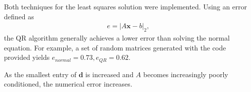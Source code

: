 \documentclass[10pt]{article}
\renewcommand{\vec}{\textbf}
\begin{document}
Both techniques for the least squares solution were implemented. Using an error defined as \begin{align*}
    e = |A\vec{x}-b|_2,
\end{align*} the QR algorithm generally achieves a lower error than solving the normal equation. For example, a set of random matrices generated with the code provided yields \(e_{normal} = 0.73, e_{QR} = 0.62\).

As the smallest entry of \(\vec{d}\) is increased and \(A\) becomes increasingly poorly conditioned, the numerical error increases.


{\small }
\end{document}
